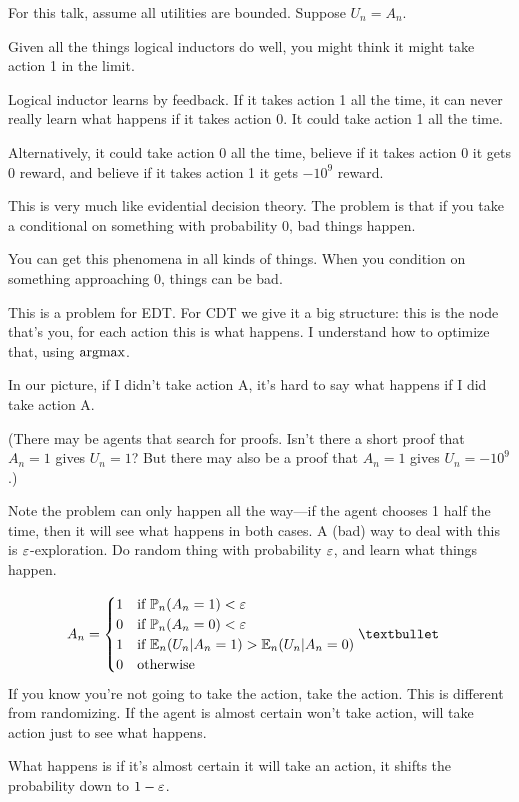 \documentclass[11pt]{article}
\begin{document}
For this talk, assume all utilities are bounded.
Suppose $U_n=A_n$.

Given all the things logical inductors do well, you might think it might take action 1 in the limit. 

Logical inductor learns by feedback. If it takes action 1 all the time, it can never really learn what happens if it takes action 0. It could take action 1 all the time.

Alternatively, it could take action 0 all the time, believe if it takes action 0 it gets 0 reward, and believe if it takes action 1 it gets $-10^9$ reward.

This is very much like evidential decision theory. The problem is that if you take a conditional on something with probability 0, bad things happen.

You can get this phenomena in all kinds of things. When you condition on something approaching 0, things can be bad.

This is a problem for EDT. For CDT we give it a big structure: this is the node that's you, for each action this is what happens. I understand how to optimize that, using $\operatorname{argmax}$. 

In our picture, if I didn't take action A, it's hard to say what happens if I did take action A.

(There may be agents that search for proofs. Isn't there a short proof that $A_n=1$ gives $U_n=1$? But there may also be a proof that $A_n=1$ gives $U_n=-10^9$.)

Note the problem can only happen all the way---if the agent chooses 1 half the time, then it will see what happens in both cases.
A (bad) way to deal with this is $\varepsilon$-exploration. Do random thing with probability $\varepsilon$, and learn what things happen.

\begin{align}\label{eq:dec2}
A_n &=
\begin{cases}
1&\text{if }\Pj_n (A_n=1)<\ep\\
0&\text{if }\Pj_n(A_n=0)<\ep\\
1&\text{if }\E_n(U_n|A_n=1)> \E_n(U_n|A_n=0)\\
0&\text{otherwise}
\end{cases}•
\end{align}
If you know you're not going to take the action, take the action. This is different from randomizing.
If the agent is almost certain won't take action, will take action just to see what happens. 

What happens is if it's almost certain it will take an action, it shifts the probability down to $1-\varepsilon$.
\end{document}
